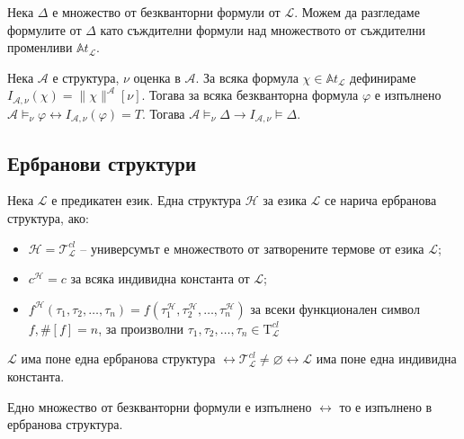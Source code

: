 \documentclass{article}
\newcommand{\Tau}{\mathrm{T}}
\begin{document}
\begin{mydef}
Нека $\Delta$ е множество от безкванторни формули от $\mathcal{L}$. Можем да разгледаме формулите от $\Delta$ като съждителни формули над множеството от съждителни променливи $\mathbb{A}t_\mathcal{L}$. 

Нека $\mathcal{A}$ е структура, $\nu$ оценка в $\mathcal{A}$. За всяка формула $\chi \in \mathbb{A}t_\mathcal{L}$ дефинираме $I_{\mathcal{A},\nu}(\chi) = \|\chi\|^\mathcal{A}[\nu]$. Тогава за всяка безкванторна формула $\varphi$ е изпълнено $\mathcal{A} \models_\nu \varphi \longleftrightarrow I_{\mathcal{A}, \nu}(\varphi) = T$. Тогава $\mathcal{A} \models_\nu \Delta \longrightarrow I_{\mathcal{A}, \nu} \models \Delta$.
\end{mydef}

\subsection*{Ербранови структури}

\begin{mydef}
Нека $\mathcal{L}$ е предикатен език. Една структура $\mathcal{H}$ за езика $\mathcal{L}$ се нарича ербранова структура, ако:
\begin{itemize}
\item $\mathcal{H} = \mathcal{T}_\mathcal{L}^{cl}$ -- универсумът е множеството от затворените термове от езика $\mathcal{L}$;
\item $c^\mathcal{H} = c$ за всяка индивидна константа от $\mathcal{L}$;
\item $f^\mathcal{H}(\tau_1, \tau_2, \ldots, \tau_n) = f(\tau_1^\mathcal{H}, \tau_2^\mathcal{H}, \ldots, \tau_n^\mathcal{H})$ за всеки функционален символ $f, \#[f]=n$, за произволни $\tau_1, \tau_2, \ldots, \tau_n \in \Tau^{cl}_\mathcal{L}$
\end{itemize}

\begin{remark}
$\mathcal{L}$ има поне една ербранова структура $\longleftrightarrow \mathcal{T}_\mathcal{L}^{cl} \neq \varnothing \longleftrightarrow \mathcal{L}$ има поне една индивидна константа.
\end{remark}

\begin{remark}
Едно множество от безкванторни формули е изпълнено $\longleftrightarrow$ то е изпълнено в ербранова структура.
\end{remark}

\end{mydef}
\end{document}
